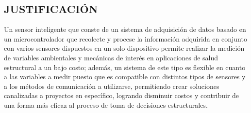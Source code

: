 \documentclass[12pt,letterpaper]{article}
\begin{document}





 \newpage


 \begin{center}
 	\section*{JUSTIFICACIÓN}
 \end{center}

\vspace{1cm}


Un sensor inteligente que conste de un sistema de adquisición de datos basado en un microcontrolador que recolecte y procese la información adquirida en conjunto con varios sensores dispuestos en un solo dispositivo permite realizar la medición de variables ambientales y mecánicas de interés en aplicaciones de salud estructural a un bajo costo; además, un sistema de este tipo es flexible en cuanto a las variables a medir puesto que es compatible con distintos tipos de sensores y a los métodos de comunicación a utilizarse, permitiendo crear soluciones canalizadas a proyectos en específico, logrando disminuir costos y contribuir de una forma más eficaz al proceso de toma de decisiones estructurales.
\end{document}
